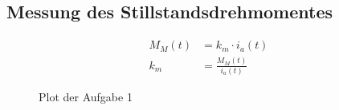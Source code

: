 \subsection{Messung des Stillstandsdrehmomentes}


\begin{equation} \label{eq111}
    \begin{split}
        M_M(t)&=k_m \cdot i_a(t)\\
        k_m&=\frac{M_M(t)}{i_a(t)}
    \end{split}
\end{equation}


\begin{figure}[H]
 \centering
 \caption{Plot der Aufgabe 1}
 \label{fig:PlotAufgabe1}
\end{figure}